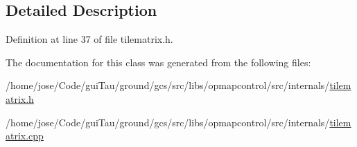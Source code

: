 \subsection{Detailed Description}


Definition at line 37 of file tilematrix.\-h.



The documentation for this class was generated from the following files\-:\begin{DoxyCompactItemize}
\item 
/home/jose/\-Code/gui\-Tau/ground/gcs/src/libs/opmapcontrol/src/internals/\hyperlink{tilematrix_8h}{tilematrix.\-h}\item 
/home/jose/\-Code/gui\-Tau/ground/gcs/src/libs/opmapcontrol/src/internals/\hyperlink{tilematrix_8cpp}{tilematrix.\-cpp}\end{DoxyCompactItemize}
